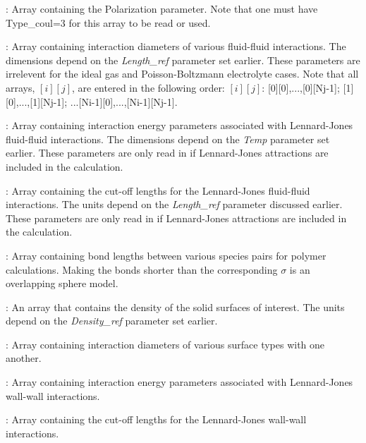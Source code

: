 \documentclass[10pt,onecolumn]{article}
\begin{document}
\vspace{0.1in}
:  Array containing the Polarization parameter.  Note that one must have Type\_coul=3
for this array to be read or used.


\vspace{0.1in}
:  Array containing interaction diameters of various
fluid-fluid interactions.   The dimensions depend on the {\it Length\_ref}
parameter set earlier. These parameters are irrelevent for the
ideal gas and Poisson-Boltzmann electrolyte cases.
Note that all arrays, $[i][j]$, are
entered in the following order:
$[i][j]$: [0][0],...,[0][Nj-1]; [1][0],...,[1][Nj-1];
...[Ni-1][0],...,[Ni-1][Nj-1].

\vspace{0.1in}
:  Array containing interaction energy parameters
associated with Lennard-Jones fluid-fluid interactions.  The dimensions
depend on the {\it Temp} parameter set earlier.
These parameters are only read in if Lennard-Jones attractions are included
in the calculation.

\vspace{0.1in}
:  Array containing the cut-off lengths for the
Lennard-Jones fluid-fluid interactions.  The units depend on the {\it Length\_ref}
parameter discussed earlier.  These parameters are only read in if
Lennard-Jones attractions are included in the calculation.

\vspace{0.1in}
:  Array containing bond lengths between various species 
pairs for polymer calculations.  
Making the bonds shorter than the corresponding $\sigma$ is an overlapping sphere model.

\vspace{0.1in}
:  An array that contains
the density of the solid surfaces of interest.  The units depend on the
{\it Density\_ref} parameter set earlier.

\vspace{0.1in}
:  Array containing interaction diameters of various
surface types with one another.

\vspace{0.1in}
:  Array containing interaction energy parameters
associated with Lennard-Jones wall-wall interactions.

\vspace{0.1in}
:  Array containing the cut-off lengths for the
Lennard-Jones wall-wall interactions.
\end{document}
